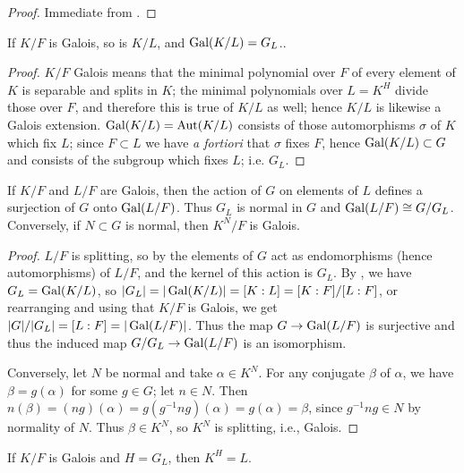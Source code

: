\begin{proof} Immediate from . \end{proof}

\begin{lemma} If $K/F$ is Galois, so is $K/L$, and $\operatorname{\text{Gal}}(K/L) = G_L$..
\label{sub_galois}
\end{lemma}

\begin{proof} $K/F$ Galois means that the minimal polynomial over $F$ of every
element of $K$ is separable and splits in $K$; the minimal polynomials over $L
= K^H$ divide those over $F$, and therefore this is true of $K/L$ as well;
hence $K/L$ is likewise a Galois extension. $\operatorname{\text{Gal}}(K/L) = \operatorname{\text{Aut}}(K/L)$ consists
of those automorphisms $\sigma$ of $K$ which fix $L$; since $F \subset L$ we
have \emph{a fortiori} that $\sigma$ fixes $F$, hence $\operatorname{\text{Gal}}(K/L) \subset G$
and consists of the subgroup which fixes $L$; i.e. $G_L$. \end{proof}

\begin{corollary} If $K/F$ and $L/F$ are Galois, then the action of $G$ on elements of $L$
defines a surjection of $G$ onto $\operatorname{\text{Gal}}(L/F)$.  Thus $G_L$ is normal in $G$ and $\operatorname{\text{Gal}}(L/F) \cong G/G_L$.  Conversely, if $N \subset G$ is normal, then $K^N/F$ is Galois.
\label{normal}
\end{corollary}

\begin{proof} $L/F$ is splitting, so by  the elements of $G$
act as endomorphisms (hence automorphisms) of $L/F$, and the kernel of this action is $G_L$.  By
, we have $G_L = \operatorname{\text{Gal}}(K/L)$, so $|G_L| = |\operatorname{\text{Gal}}(K/L)| = [K : L] = [K : F] / [L : F]$,
or rearranging and using that $K/F$ is Galois, we get $|G|/|G_L| = [L : F] =
|\operatorname{\text{Gal}}(L/F)|$.  Thus the map $G \to \operatorname{\text{Gal}}(L/F)$ is surjective and thus the induced map $G/G_L \to
\operatorname{\text{Gal}}(L/F)$ is an isomorphism.

Conversely, let $N$ be normal and take $\alpha \in K^N$.  For any conjugate $\beta$ of $\alpha$, we
have $\beta = g(\alpha)$ for some $g \in G$; let $n \in N$.  Then $n(\beta) = (ng)(\alpha) =
g(g^{-1} n g)(\alpha) = g(\alpha) = \beta$, since $g^{-1} n g \in N$ by normality of $N$.  Thus
$\beta \in K^N$, so $K^N$ is splitting, i.e., Galois. \end{proof}

\begin{proposition} If $K/F$ is Galois and $H = G_L$, then $K^H = L$.
\label{fixed_field}
\end{proposition}

